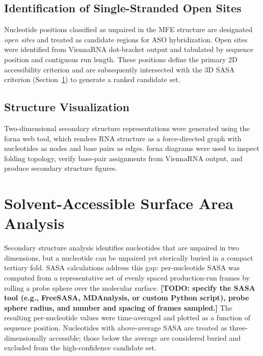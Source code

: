 \subsection{Identification of Single-Stranded Open Sites}

Nucleotide positions classified as unpaired in the MFE structure are
designated \emph{open sites} and treated as candidate regions for ASO
hybridization.
Open sites were identified from ViennaRNA dot-bracket output and
tabulated by sequence position and contiguous run length.
These positions define the primary 2D accessibility criterion and are
subsequently intersected with the 3D SASA criterion
(Section~\ref{sec:sasa}) to generate a ranked candidate set.

\subsection{Structure Visualization}

Two-dimensional secondary structure representations were generated using
the forna web tool, which renders RNA structure as a force-directed graph
with nucleotides as nodes and base pairs as edges.
forna diagrams were used to inspect folding topology, verify base-pair
assignments from ViennaRNA output, and produce secondary structure
figures.

\section{Solvent-Accessible Surface Area Analysis}
\label{sec:sasa}

Secondary structure analysis identifies nucleotides that are unpaired in
two dimensions, but a nucleotide can be unpaired yet sterically buried
in a compact tertiary fold.
SASA calculations address this gap: per-nucleotide SASA was computed
from a representative set of evenly spaced production-run frames by
rolling a probe sphere over the molecular surface.
\textbf{[TODO: specify the SASA tool (e.g., FreeSASA, MDAnalysis, or
custom Python script), probe sphere radius, and number and spacing of
frames sampled.]}
The resulting per-nucleotide values were time-averaged and plotted as a
function of sequence position.
Nucleotides with above-average SASA are treated as three-dimensionally
accessible; those below the average are considered buried and excluded
from the high-confidence candidate set.

